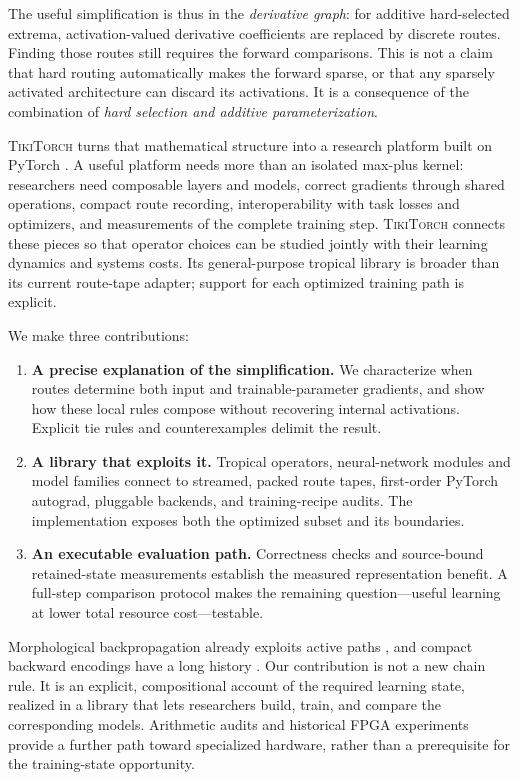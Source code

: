 \documentclass{article}
\theoremstyle{plain}
\theoremstyle{definition}
\theoremstyle{remark}
\newcommand{\ttorch}{\textsc{TikiTorch}}
\begin{document}
The useful simplification is thus in the \emph{derivative graph}: for
additive hard-selected extrema, activation-valued derivative coefficients
are replaced by discrete routes. Finding those routes still requires the
forward comparisons. This is not a claim that hard routing automatically
makes the forward sparse, or that any sparsely activated architecture can
discard its activations. It is a consequence of the combination of
\emph{hard selection and additive parameterization}.

\ttorch{} turns that mathematical structure into a research platform built
on PyTorch \citep{paszke2019pytorch}. A useful platform needs more than an
isolated max-plus kernel: researchers need composable layers and models,
correct gradients through shared operations, compact route recording,
interoperability with task losses and optimizers, and measurements of the
complete training step. \ttorch{} connects these pieces so that operator
choices can be studied jointly with their learning dynamics and systems
costs. Its general-purpose tropical library is broader than its current
route-tape adapter; support for each optimized training path is explicit.

We make three contributions:
\begin{enumerate}
\item \textbf{A precise explanation of the simplification.} We characterize
when routes determine both input and trainable-parameter gradients, and
show how these local rules compose without recovering internal activations.
Explicit tie rules and counterexamples delimit the result.
\item \textbf{A library that exploits it.} Tropical operators, neural-network
modules and model families connect to streamed, packed route tapes,
first-order PyTorch autograd, pluggable backends, and training-recipe audits.
The implementation exposes both the optimized subset and its boundaries.
\item \textbf{An executable evaluation path.} Correctness checks and
source-bound retained-state measurements establish the measured
representation benefit. A full-step comparison protocol makes the remaining
question---useful learning at lower total resource cost---testable.
\end{enumerate}

Morphological backpropagation already exploits active paths
\citep{groenendijk2023geometric}, and compact backward encodings have a long
history \citep{jain2018gist}. Our contribution is not a new chain rule.
It is an explicit, compositional account of the required learning state,
realized in a library that lets researchers build, train, and compare the
corresponding models. Arithmetic audits and historical FPGA experiments
provide a further path toward specialized hardware, rather than a
prerequisite for the training-state opportunity.
\end{document}
